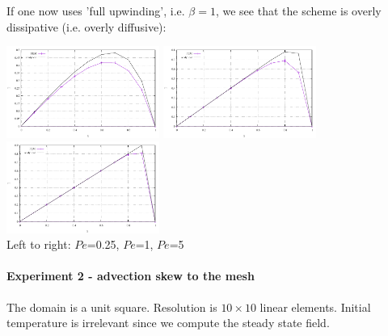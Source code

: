If one now uses 'full upwinding', i.e. $\beta=1$, we see that the scheme is 
overly dissipative (i.e. overly diffusive):

\begin{center}
\includegraphics[width=5cm]{python_codes/fieldstone_65/results/artdiff1/T1.pdf}
\includegraphics[width=5cm]{python_codes/fieldstone_65/results/artdiff1/T2.pdf}
\includegraphics[width=5cm]{python_codes/fieldstone_65/results/artdiff1/T3.pdf}\\
{\captionfont Left to right: $Pe$=0.25, $Pe$=1, $Pe$=5}
\end{center}

\newpage
\paragraph{Experiment 2 - advection skew to the mesh}

The domain is a unit square. Resolution is $10\times10$ linear elements. Initial temperature is 
irrelevant since we compute the steady state field. 

